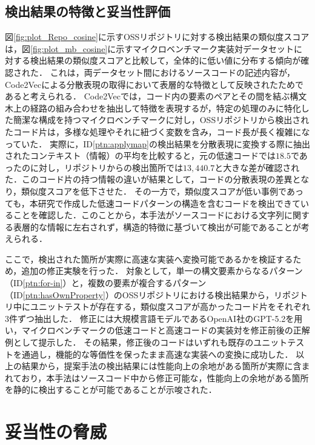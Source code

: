 \documentclass[11pt]{jreport}
\begin{document}
\section{検出結果の特徴と妥当性評価}

図\ref{fig:plot_Repo_cosine}に示すOSSリポジトリに対する検出結果の類似度スコアは，図\ref{fig:plot_mb_cosine}に示すマイクロベンチマーク実装対データセットに対する検出結果の類似度スコアと比較して，全体的に低い値に分布する傾向が確認された．
これは，両データセット間におけるソースコードの記述内容が，Code2Vecによる分散表現の取得において表層的な特徴として反映されたためであると考えられる．
Code2Vecでは，コード内の要素のペアとその間を結ぶ構文木上の経路の組み合わせを抽出して特徴を表現するが，特定の処理のみに特化した簡潔な構成を持つマイクロベンチマークに対し，OSSリポジトリから検出されたコード片は，多様な処理やそれに紐づく変数を含み，コード長が長く複雑になっていた．
実際に，ID\ref{ptn:applymap}の検出結果を分散表現に変換する際に抽出されたコンテキスト（情報）の平均を比較すると，元の低速コードでは$18.5$であったのに対し，リポジトリからの検出箇所では$13,440.7$と大きな差が確認された．このコード片の持つ情報の違いが結果として，コードの分散表現の差異となり，類似度スコアを低下させた．
その一方で，類似度スコアが低い事例であっても，本研究で作成した低速コードパターンの構造を含むコードを検出できていることを確認した．このことから，本手法がソースコードにおける文字列に関する表層的な情報に左右されず，構造的特徴に基づいて検出が可能であることが考えられる．

ここで，検出された箇所が実際に高速な実装へ変換可能であるかを検証するため，追加の修正実験を行った．
対象として，単一の構文要素からなるパターン（ID\ref{ptn:for-in}）と，複数の要素が複合するパターン（ID\ref{ptn:hasOwnProperty}）のOSSリポジトリにおける検出結果から，リポジトリ中にユニットテストが存在する，類似度スコアが高かったコード片をそれぞれ3件ずつ抽出した．
修正には大規模言語モデルであるOpenAI社のGPT-5.2を用い，マイクロベンチマークの低速コードと高速コードの実装対を修正前後の正解例として提示した．
その結果，修正後のコードはいずれも既存のユニットテストを通過し，機能的な等価性を保ったまま高速な実装への変換に成功した．
以上の結果から，提案手法の検出結果には性能向上の余地がある箇所が実際に含まれており，本手法はソースコード中から修正可能な，性能向上の余地がある箇所を静的に検出することが可能であることが示唆された．


\chapter{妥当性の脅威}
\label{chap:threat}
\end{document}
